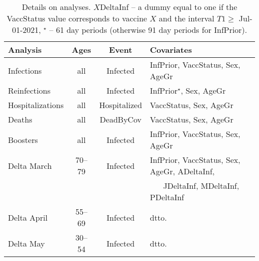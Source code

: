 \documentclass[preprint,12pt,authoryear]{elsarticle}
\begin{document}
\begin{table}
\caption{Details on analyses. $X$DeltaInf -- a dummy equal to one if the VaccStatus value corresponds to vaccine $X$ and the interval $T1 \geq$ Jul-01-2021, $^\star$ -- 61 day periods (otherwise 91 day periods for InfPrior). \vspace{1mm}}
\centering
\begin{tabular}{lccl}
\hline
Analysis & Ages & Event & Covariates \\ \hline
Infections  & all & Infected & 
InfPrior, VaccStatus, Sex, AgeGr \\
Reinfections & all & Infected & InfPrior$^\star$, Sex, AgeGr \\
Hospitalizations & all & Hospitalized & VaccStatus, Sex, AgeGr \\
Deaths & all & DeadByCov & VaccStatus, Sex, AgeGr \\
Boosters & all & Infected &
InfPrior, VaccStatus, Sex, AgeGr \\
Delta March& 70--79 & Infected & InfPrior, VaccStatus, Sex, AgeGr, ADeltaInf,\\
& & & 
\,\,\,\,\,\,\,\, JDeltaInf, MDeltaInf, PDeltaInf \\
Delta April& 55--69 & Infected & dtto. \\
Delta May& 30--54 & Infected & dtto. \\
\hline
\end{tabular}
\end{table}
\end{document}
